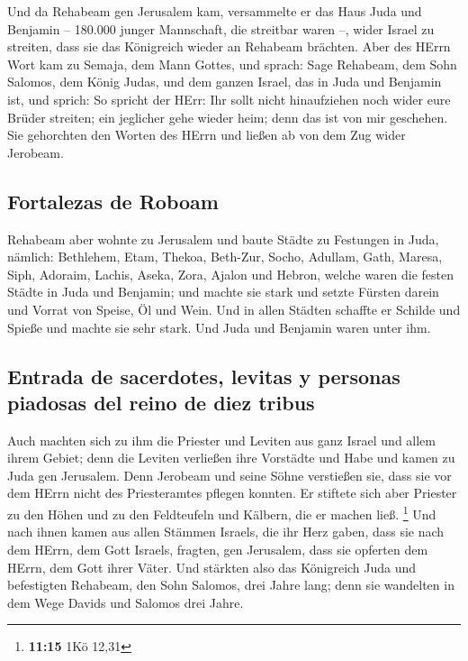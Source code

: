  Und da Rehabeam gen Jerusalem kam, versammelte er das
Haus Juda und Benjamin -- 180.000 junger Mannschaft, die streitbar waren
--, wider Israel zu streiten, dass sie das Königreich wieder an Rehabeam
brächten.  Aber des HErrn Wort kam zu Semaja, dem Mann
Gottes, und sprach:  Sage Rehabeam, dem Sohn Salomos, dem
König Judas, und dem ganzen Israel, das in Juda und Benjamin ist, und
sprich:  So spricht der HErr: Ihr sollt nicht hinaufziehen
noch wider eure Brüder streiten; ein jeglicher gehe wieder heim; denn
das ist von mir geschehen. Sie gehorchten den Worten des HErrn und
ließen ab von dem Zug wider Jerobeam.

\hypertarget{fortalezas-de-roboam}{%
\subsection{Fortalezas de Roboam}\label{fortalezas-de-roboam}}

 Rehabeam aber wohnte zu Jerusalem und baute Städte zu
Festungen in Juda,  nämlich: Bethlehem, Etam, Thekoa,
 Beth-Zur, Socho, Adullam,  Gath, Maresa,
Siph,  Adoraim, Lachis, Aseka,  Zora,
Ajalon und Hebron, welche waren die festen Städte in Juda und Benjamin;
 und machte sie stark und setzte Fürsten darein und
Vorrat von Speise, Öl und Wein.  Und in allen Städten
schaffte er Schilde und Spieße und machte sie sehr stark. Und Juda und
Benjamin waren unter ihm.

\hypertarget{entrada-de-sacerdotes-levitas-y-personas-piadosas-del-reino-de-diez-tribus}{%
\subsection{Entrada de sacerdotes, levitas y personas piadosas del reino
de diez
tribus}\label{entrada-de-sacerdotes-levitas-y-personas-piadosas-del-reino-de-diez-tribus}}

 Auch machten sich zu ihm die Priester und Leviten aus
ganz Israel und allem ihrem Gebiet;  denn die Leviten
verließen ihre Vorstädte und Habe und kamen zu Juda gen Jerusalem. Denn
Jerobeam und seine Söhne verstießen sie, dass sie vor dem HErrn nicht
des Priesteramtes pflegen konnten.  Er stiftete sich aber
Priester zu den Höhen und zu den Feldteufeln und Kälbern, die er machen
ließ. \footnote{\textbf{11:15} 1Kö 12,31}  Und nach ihnen
kamen aus allen Stämmen Israels, die ihr Herz gaben, dass sie nach dem
HErrn, dem Gott Israels, fragten, gen Jerusalem, dass sie opferten dem
HErrn, dem Gott ihrer Väter.  Und stärkten also das
Königreich Juda und befestigten Rehabeam, den Sohn Salomos, drei Jahre
lang; denn sie wandelten in dem Wege Davids und Salomos drei Jahre.


